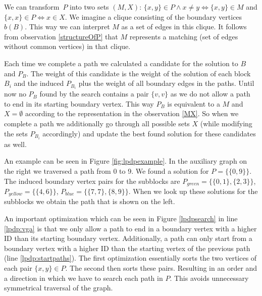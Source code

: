 \documentclass[11pt]{article}
\begin{document}
\begin{observation}\label{MX}
We can transform~$P$ into two sets $(M,X)$: $\{x,y\} \in P \land x \neq y \iff \{x,y\} \in M$ and $\{x,x\} \in P \iff x \in X$. We imagine a clique consisting of the boundary vertices $b(B)$. This way we can interpret $M$ as a set of edges in this clique. It follows from observation \ref{structureOfP} that $M$ represents a matching (set of edges without common vertices) in that clique.
\end{observation}

Each time we complete a path we calculated a candidate for the solution to $B$ and $P_B$. The weight of this candidate is the weight of the solution of each block $B_i$ and the induced $P_{B_i}$ plus the weight of all boundary edges in the paths. Until now no $P_B$ found by the search contains a pair $\{v,v\}$ as we do not allow a path to end in its starting boundary vertex. This way $P_B$ is equivalent to a $M$ and $X = \emptyset$ according to the representation in the observation \ref{MX}. So when we complete a path we additionally go through all possible sets $X$ (while modifying the sets $P_{B_i}$ accordingly) and update the best found solution for these candidates as well.

An example can be seen in Figure \ref{fig:lpdpexample}. In the auxiliary graph on the right we traversed a path from 0 to 9. We found a solution for $P = \{\{0,9\}\}$. The induced boundary vertex pairs for the subblocks are $P_{green} = \{\{0,1\}, \{2,3\}\}$, $P_{yellow} = \{\{4,6\}\}$, $P_{blue} = \{\{7,7\}, \{8,9\}\}$. When we look up these solutions for the subblocks we obtain the path that is shown on the left.

An important optimization which can be seen in Figure \ref{lpdpsearch} in line \ref{lpdp:vga} is that we only allow a path to end in a boundary vertex with a higher ID than its starting boundary vertex. Additionally, a path can only start from a boundary vertex with a higher ID than the starting vertex of the previous path (line \ref{lpdp:startpaths}). The first optimization essentially sorts the two vertices of each pair $\{x,y\} \in P$. The second then sorts these pairs. Resulting in an order and a direction in which we have to search each path in $P$. This avoids unnecessary symmetrical traversal of the graph.
\end{document}
